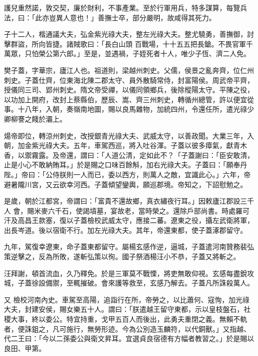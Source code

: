 \begin{pinyinscope}
 護兒重然諾，敦交契，廉於財利，不事產業。至於行軍用兵，特多謀算，每覽兵法，曰：「此亦豈異人意也！」善撫士卒，部分嚴明，故咸得其死力。



 子十二人，楷通議大夫，弘金紫光祿大夫，整左光祿大夫。整尤驍勇，善撫御，討擊群盜，所向皆捷。諸賊歌曰：「長白山頭
 百戰場，十十五五把長鎗。不畏官軍千萬眾，只怕榮公第六郎。」至是，並遇禍，子姪死者十人，唯少子恆、濟二人免。



 樊子蓋，字華宗，廬江人也。祖道則，梁越州刺史。父儒，侯景之亂奔齊，位仁州刺史。子蓋仕齊，位東海北陳二郡太守、員外散騎常侍，封富陽侯。周武帝平齊，授儀同三司、郢州刺史。隋文帝受禪，以儀同領鄉兵，後除樅陽太守。平陳之役，以功加上開府，改封上蔡縣伯，歷辰、嵩、齊三州刺史，轉循州總管，許以便宜從事。十八年，入朝，奏嶺南地圖，賜以良馬雜物，加統四州，令還任所，遣光祿少
 卿柳謇之餞於灞上。



 煬帝即位，轉涼州刺史，改授銀青光祿大夫、武威太守，以善政聞。大業三年，入朝，加金紫光祿大夫。五年，車駕西巡，將入吐谷渾。子蓋以彼多瘴氣，獻青木香，以禦霧露。及帝還，謂曰：「人道公清，定如此不？「子蓋謝曰：「臣安敢清，止是小心不敢納賄耳。」於是賜之口味百餘斛，加右光祿大夫。子蓋曰：「願奉丹陛。」帝曰：「公侍朕則一人而已，委以西方，則萬人之敵，宜識此心。」六年，帝避暑隴川宮，又云欲幸河西。子蓋傾望鑾輿，願巡郡境。帝知之，下詔慰勉之。



 是歲，朝於江都宮，帝謂曰：「富貴不還故鄉，真衣繡夜行耳。」因敕廬江郡設三千人
 會，賜米麥六千石，使謁墳墓，宴故老，當時榮之。還除戶部尚書。時處羅可汗及高昌王款塞，復以子蓋檢校武威太守，應接二蕃。遼東之役，攝左武衛將軍，出長岑道。後以宿衛不行。加左光祿大夫。其年，帝還東都，使子蓋涿郡留守。



 九年，駕復幸遼東，命子蓋東都留守。屬楊玄感作逆，逼城，子蓋遣河南贊務裴弘策逆擊之，反為所敗，遂斬弘策以徇。國子祭酒楊汪小不恭，子蓋又將斬之。



 汪拜謝，頓首流血，久乃釋免。於是三軍莫不戰慄，將吏無敢仰視。玄感每盡銳攻城，子蓋徐設備禦，至輒摧破。會來護等救至，玄感乃解去。子蓋凡所誅殺萬人。



 又
 檢校河南內史。車駕至高陽，追詣行在所，帝勞之，以比蕭何、寇恂，加光祿大夫，封建安侯，賜女樂五十人。謂曰：「朕遣越王留守東都，示以皇枝盤石，社稷大事，終以委公。特宜持重，戈甲五百人而後出，此勇夫重閉之義。無賴不軌者，便誅鉏之，凡可施行，無勞形迹。今為公別造玉麟符，以代銅獸。」又指越、代二王曰：「今以二孫委公與衛文昇耳。宜選貞良宿德有方幅者教習之。」於是賜以良田、甲第。




\end{pinyinscope}
